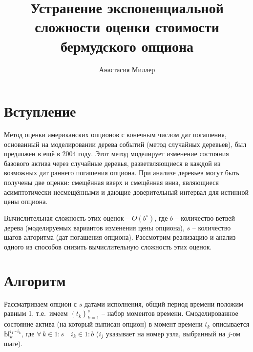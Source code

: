 \documentclass[12pt,twoside,titlepage,сa4paper]{article}
\title{Устранение экспоненциальной сложности оценки стоимости бермудского опциона}
\author{Анастасия Миллер}
\begin{document}
\maketitle
\tableofcontents
\newpage

\section{Вступление}
	\par Метод оценки американских опционов с конечным числом дат погашения, основанный на моделировании дерева событий (метод случайных деревьев), был предложен в  ещё в 2004 году. Этот метод моделирует изменение состояния базового актива через случайные деревья, разветвляющиеся в каждой из возможных дат раннего погашения опциона. При анализе деревьев могут быть получены две оценки: смещённая вверх и смещённая вниз, являющиеся асимптотически несмещёнными и дающие доверительный интервал для истинной цены опциона.
	\par Вычислительная сложность этих оценок -- $O\left( b^s \right)$, где $b$ -- количество ветвей дерева (моделируемых вариантов изменения цены опциона), $s$ -- количество шагов алгоритма (дат погашения опциона). Рассмотрим реализацию и анализ одного из способов снизить вычислительную сложность этих оценок.

\section{Алгоритм}
	\par Рассматриваем опцион с $s$ датами исполнения, общий период времени положим равным 1, т.е.\ имеем $\left\lbrace t_k \right\rbrace _{k=1}^s$ -- набор моментов времени. Смоделированное состояние актива (на который выписан опцион) в момент времени $t_k$ описывается $Ы_k^{i_1 \cdots i_k}$, где $\forall\, k \in 1:s\quad i_k \in 1:b$ ($i_j$ указывает на номер узла, выбранный на $j$-ом шаге).
	
\end{document}

